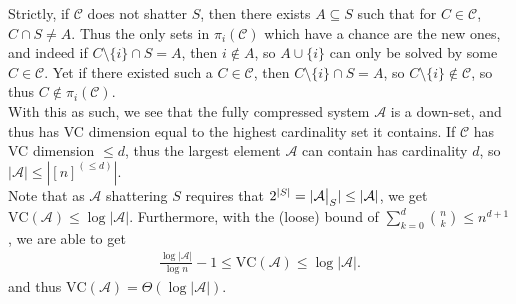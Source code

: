 \documentclass{tikzposter} %
\newcommand{\mc}{\mathcal}
\newcommand\restr[2]{{%
  \left.\kern-\nulldelimiterspace %
  #1 %
  \vphantom{\big|} %
  \right|_{#2} %
  }}
\newtheorem{theorem}{Theorem}
\begin{document}
\begin{columns}
{      Strictly, if $\mc{C}$ does not shatter $S$, then there exists $A \subseteq S$ such that for $C \in \mc{C}$, $C \cap S \neq A$. Thus the only sets in $\pi_i(\mc{C})$ which have a chance are the new ones, and indeed if $C \setminus \{i\} \cap S = A$, then $i \not\in A$, so $A \cup \{i\}$ can only be solved by some $C \in \mc{C}$. Yet if there existed such a $C \in \mc{C}$, then $C \setminus \{i\} \cap S = A$, so $C \setminus \{i\} \not\in \mc{C}$, so thus $C \not\in \pi_i(\mc{C})$. \\

      With this as such, we see that the fully compressed system $\mc{A}$ is a down-set, and thus has VC dimension equal to the highest cardinality set it contains. If $\mc{C}$ has VC dimension $\le d$, thus the largest element $\mc{A}$ can contain has cardinality $d$, so $|\mc{A}| \le |[n]^{(\le d)}|$. \\

      Note that as $\mc{A}$ shattering $S$ requires that $2^{|S|} = |\restr{\mc{A}}{S}| \le |\mc{A}|$, we get $\mathrm{VC}(\mc{A}) \le \log |\mc{A}|$. Furthermore, with the (loose) bound of $\sum_{k = 0}^d {n \choose k} \le n^{d+1}$, we are able to get
      \begin{align*}
        \frac{\log |\mc{A}|}{\log n} - 1\le \mathrm{VC}(\mc{A}) \le \log |\mc{A}|.
      \end{align*}
      and thus $\mathrm{VC}(\mc{A}) = \Theta(\log |\mc{A}|)$.
      }

\end{columns}
\end{document}
